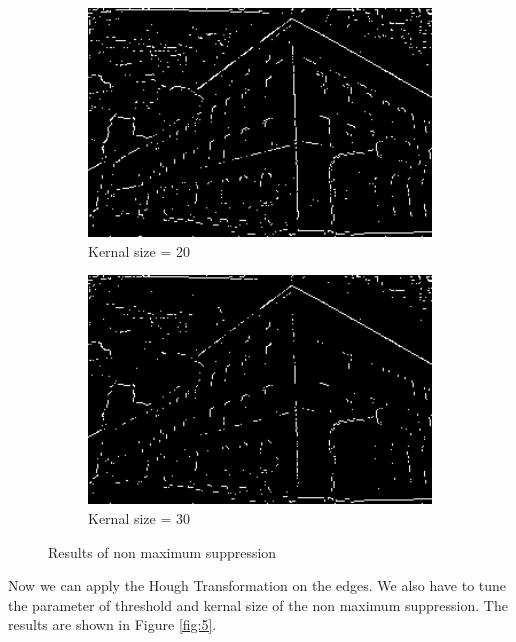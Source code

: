 \documentclass[12pt
,headinclude
,headsepline
,bibtotocnumbered
]{scrartcl}
\begin{document}
\begin{figure}[H]
    \\
    \begin{subfigure}{0.45\textwidth}
        \includegraphics[width=1\textwidth]{plots/edges_20.png}
        \caption*{Kernal size = 20}
    \end{subfigure}
    \hfill
    \begin{subfigure}{0.45\textwidth}
        \includegraphics[width=1\textwidth]{plots/edges_30.png}
        \caption*{Kernal size = 30}
    \end{subfigure}
    \caption{Results of non maximum suppression}
    \label{fig:4}
\end{figure}
Now we can apply the Hough Transformation on the edges. We also have to tune the parameter of threshold and kernal size of the non maximum suppression. The results are shown in Figure \ref{fig:5}.
\end{document}
